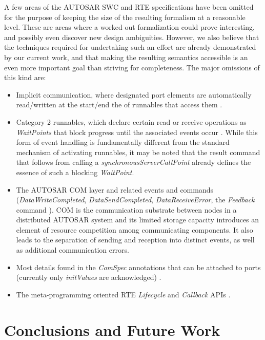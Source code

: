 \documentclass[10pt,conference]{IEEEtran}
\begin{document}
A few areas of the AUTOSAR SWC and RTE specifications have been omitted for the purpose of keeping the size of the resulting formalism at a reasonable level. These are areas where a worked out formalization could prove interesting, and possibly even discover new design ambiguities. However, we also believe that the techniques required for undertaking such an effort are already demonstrated by our current work, and that making the resulting semantics accessible is an even more important goal than striving for completeness. The major omissions of this kind are:
\begin{itemize}
\item Implicit communication, where designated port elements are automatically read/written at the start/end the of runnables that access them \cite[ch.~4.3.1.5]{AR:RTE}.
\item Category 2 runnables, which declare certain read or receive operations as \emph{WaitPoints} that block progress until the associated events occur \cite[ch.~7.2.4.4]{AR:SWC}. While this form of event handling is fundamentally different from the standard mechanism of activating runnables, it may be noted that the result command that follows from calling a \emph{synchronousServerCallPoint} already defines the essence of such a blocking \emph{WaitPoint}.
\item The AUTOSAR COM layer \cite{AR:COM} and related events and commands (\emph{DataWriteCompleted}, \emph{DataSendCompleted}, \emph{DataReceiveError}, the {\em Feedback} command \cite[ch.~5.7.5, 5.6.8]{AR:RTE}). COM is the communication substrate between nodes in a distributed AUTOSAR system and its limited storage capacity introduces an element of resource competition among communicating components. It also leads to the separation of sending and reception into distinct events, as well as additional communication errors.
\item Most details found in the \emph{ComSpec} annotations that can be attached to ports (currently only \emph{initValues} are acknowledged) \cite[ch.~4.5]{AR:SWC}.
\item The meta-programming oriented RTE {\em Lifecycle} and {\em Callback} APIs \cite[ch.~5.8-9]{AR:RTE}.
\end{itemize}


\section{Conclusions and Future Work}
\label{sec:Conc}
\end{document}
